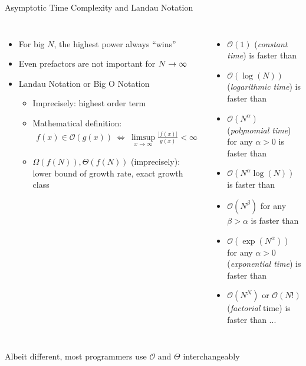 \begin{frame}{Asymptotic Time Complexity and Landau Notation}
%
\begin{columns}[T]
\begin{itemize}
\item For big $N$, the highest power always \enquote{wins}
\item Even prefactors are not important for $N \rightarrow \infty$
\item Landau Notation or Big O Notation
	\begin{itemize}
	\item Imprecisely: highest order term
	\item Mathematical definition:
	\begin{align*}
		f(x) \in \mathcal{O}(g(x))
		~
		\Leftrightarrow
		~
		\limsup_{x \to \infty} 
			\frac
			{|f(x)|}
			{g(x)}
		< \infty
	\end{align*}
	\item $\Omega(f(N)), \Theta(f(N))$ (imprecisely): lower bound of growth rate, exact growth class
	\end{itemize}
\end{itemize}
%
\begin{itemize}
\item $\mathcal{O}(1)$ (\emph{constant time}) is faster than
\item $\mathcal{O}(\log(N))$ (\emph{logarithmic time}) is faster than
\item $\mathcal{O}(N^{\alpha})$ (\emph{polynomial time}) for any $\alpha > 0$ is faster than
\item $\mathcal{O}(N^{\alpha} \log(N))$ is faster than
\item $\mathcal{O}(N^{\beta})$ for any $\beta > \alpha$ is faster than
\item $\mathcal{O}(\exp(N^\alpha))$  for any $\alpha > 0$ (\emph{exponential time}) is faster than
\item $\mathcal{O}(N^N)$ or $\mathcal{O}(N!)$ (\emph{factorial} time) is faster than ...
\end{itemize}
\end{columns}
%
\begin{center}
Albeit different, most programmers use $\mathcal{O}$ and $\Theta$ interchangeably
\end{center}
%
\end{frame}


